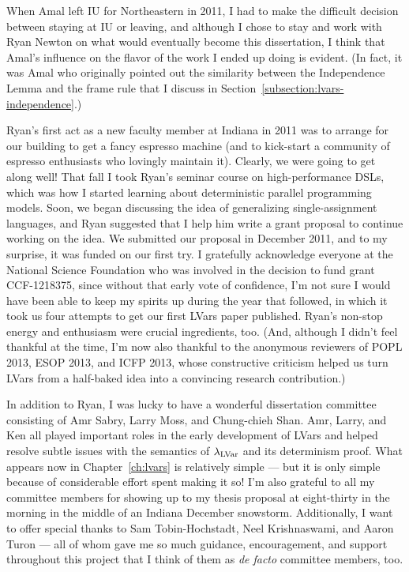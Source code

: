 When Amal left IU for Northeastern in 2011, I had to make the
difficult decision between staying at IU or leaving, and although I
chose to stay and work with Ryan Newton on what would eventually
become this dissertation, I think that Amal's influence on the flavor
of the work I ended up doing is evident.  (In fact, it was Amal who
originally pointed out the similarity between the Independence Lemma
and the frame rule that I discuss in
Section~\ref{subsection:lvars-independence}.)

Ryan's first act as a new faculty member at Indiana in 2011 was to
arrange for our building to get a fancy espresso machine (and to
kick-start a community of espresso enthusiasts who lovingly maintain
it).  Clearly, we were going to get along well!  That fall I took
Ryan's seminar course on high-performance DSLs, which was how I
started learning about deterministic parallel programming models.
Soon, we began discussing the idea of generalizing single-assignment
languages, and Ryan suggested that I help him write a grant proposal
to continue working on the idea.  We submitted our proposal in
December 2011, and to my surprise, it was funded on our first try.  I
gratefully acknowledge everyone at the National Science Foundation who
was involved in the decision to fund grant CCF-1218375, since without
that early vote of confidence, I'm not sure I would have been able to
keep my spirits up during the year that followed, in which it took us
four attempts to get our first LVars paper published.  Ryan's non-stop
energy and enthusiasm were crucial ingredients, too.  (And, although I
didn't feel thankful at the time, I'm now also thankful to the
anonymous reviewers of POPL 2013, ESOP 2013, and ICFP 2013, whose
constructive criticism helped us turn LVars from a half-baked idea
into a convincing research contribution.)

In addition to Ryan, I was lucky to have a wonderful dissertation
committee consisting of Amr Sabry, Larry Moss, and Chung-chieh Shan.
Amr, Larry, and Ken all played important roles in the early
development of LVars and helped resolve subtle issues with the
semantics of $\lambda_{\textrm{LVar}}$ and its determinism proof.  What appears
now in Chapter~\ref{ch:lvars} is relatively simple --- but it is only
simple because of considerable effort spent making it so!  I'm also
grateful to all my committee members for showing up to my thesis
proposal at eight-thirty in the morning in the middle of an Indiana
December snowstorm.  Additionally, I want to offer special thanks to
Sam Tobin-Hochstadt, Neel Krishnaswami, and Aaron Turon --- all of
whom gave me so much guidance, encouragement, and support throughout
this project that I think of them as \emph{de facto} committee
members, too.

